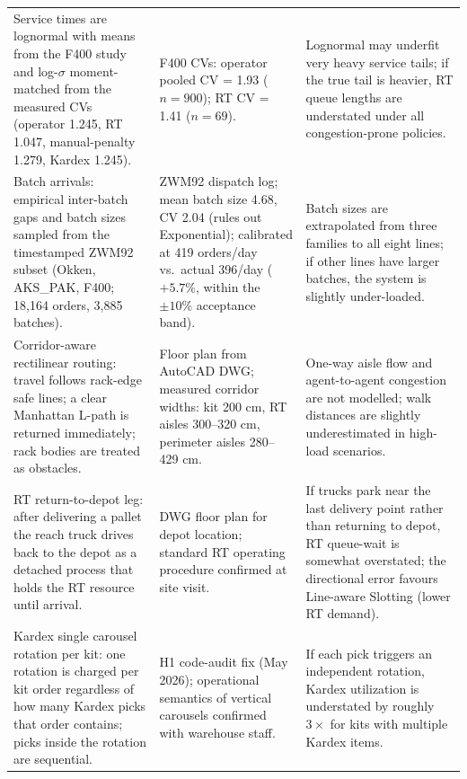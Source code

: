 \begin{table}[htbp]
\begin{tabular}{p{4.8cm} p{4.8cm} p{4.8cm}}
    Service times are lognormal with means from the F400 study and
    log-$\sigma$ moment-matched from the measured CVs
    (operator 1.245, RT 1.047, manual-penalty 1.279, Kardex 1.245).
    &
    F400 CVs: operator pooled CV = 1.93 ($n = 900$); RT CV = 1.41
    ($n = 69$).
    &
    Lognormal may underfit very heavy service tails; if the true
    tail is heavier, RT queue lengths are understated under all
    congestion-prone policies. \\[4pt]

    Batch arrivals: empirical inter-batch gaps and batch sizes sampled
    from the timestamped ZWM92 subset (Okken, AKS\_PAK, F400;
    18,164 orders, 3,885 batches).
    &
    ZWM92 dispatch log; mean batch size 4.68, CV 2.04 (rules out
    Exponential); calibrated at 419 orders/day vs.\ actual 396/day
    ($+5.7\%$, within the $\pm 10\%$ acceptance band).
    &
    Batch sizes are extrapolated from three families to all eight lines;
    if other lines have larger batches, the system is slightly
    under-loaded. \\[4pt]

    Corridor-aware rectilinear routing: travel follows rack-edge safe
    lines; a clear Manhattan L-path is returned immediately; rack
    bodies are treated as obstacles.
    &
    Floor plan from AutoCAD DWG; measured corridor widths: kit 200 cm,
    RT aisles 300--320 cm, perimeter aisles 280--429 cm.
    &
    One-way aisle flow and agent-to-agent congestion are not modelled;
    walk distances are slightly underestimated in high-load scenarios. \\[4pt]

    RT return-to-depot leg: after delivering a pallet the reach truck
    drives back to the depot as a detached process that holds the RT
    resource until arrival.
    &
    DWG floor plan for depot location; standard RT operating procedure
    confirmed at site visit.
    &
    If trucks park near the last delivery point rather than returning to
    depot, RT queue-wait is somewhat overstated; the directional error
    favours Line-aware Slotting (lower RT demand). \\[4pt]

    Kardex single carousel rotation per kit: one rotation is charged
    per kit order regardless of how many Kardex picks that order
    contains; picks inside the rotation are sequential.
    &
    H1 code-audit fix (May 2026); operational semantics of vertical
    carousels confirmed with warehouse staff.
    &
    If each pick triggers an independent rotation, Kardex utilization
    is understated by roughly $3\times$ for kits with multiple Kardex
    items. \\[4pt]


\end{tabular}
\end{table}
